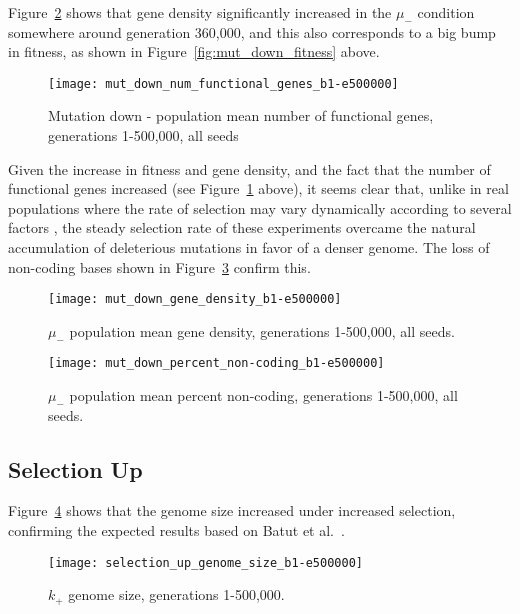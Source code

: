 Figure~\ref{fig:mut_down_gene_density} shows that gene density significantly increased in the $\mu_-$ condition somewhere around generation 360,000, and this also corresponds to a big bump in fitness, as shown in Figure~\ref{fig:mut_down_fitness} above. 

\begin{figure}[h]
	\centering
	\texttt{[image: mut\_down\_num\_functional\_genes\_b1-e500000]}
	\caption[Mutation down number of functional genes]{Mutation down - population mean number of functional genes, generations 1-500,000, all seeds}
	\label{fig:mut_down_num_functional_genes}
\end{figure}

Given the increase in fitness and gene density, and the fact that the number of functional genes increased (see Figure~\ref{fig:mut_down_num_functional_genes} above), it seems clear that, unlike in real populations where the rate of selection may vary dynamically according to several factors \cite{lynch2016genetic}, the steady selection rate of these experiments overcame the natural accumulation of deleterious mutations in favor of a denser genome. The loss of non-coding bases shown in Figure~\ref{fig:mut_down_perc_non-coding} confirm this.

\begin{figure}[h]
	\centering
	\texttt{[image: mut\_down\_gene\_density\_b1-e500000]}
	\caption[Mutation down gene density]{$\mu_-$ population mean gene density, generations 1-500,000, all seeds.}
	\label{fig:mut_down_gene_density}
\end{figure}


\begin{figure}[h]
	\centering
	\texttt{[image: mut\_down\_percent\_non-coding\_b1-e500000]}
	\caption[Mutation down percent non-coding]{$\mu_-$ population mean percent non-coding, generations 1-500,000, all seeds.}
	\label{fig:mut_down_perc_non-coding}
\end{figure}


\subsection{Selection Up}
Figure~\ref{fig:selection_up_genome_size} shows that the genome size increased under increased selection, confirming the expected results based on Batut et al.~\cite{Batut.2013}. 
\begin{figure}[H]
	\centering
	\texttt{[image: selection\_up\_genome\_size\_b1-e500000]}
	\caption[Selection up genome size]{$k_+$ genome size, generations 1-500,000.}
	\label{fig:selection_up_genome_size}
\end{figure}

